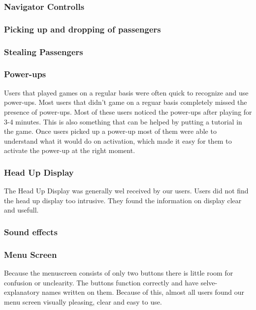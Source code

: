{\subsubsection*{Navigator Controlls}

\subsubsection*{Picking up and dropping of passengers}

\subsubsection*{Stealing Passengers}

\subsubsection*{Power-ups}

Users that played games on a regular basis were often quick to recognize and use power-ups. Most users that didn't game on a reguar basis  completely missed the presence of power-ups. Most of these users noticed the power-ups after playing for 3-4 minutes. This is also something that can be helped by putting a tutorial in the game. Once users picked up a power-up most of them were able to understand what it would do on activation, which made it easy for them to activate the power-up at the right moment.


\subsubsection*{Head Up Display}

The Head Up Display was generally wel received by our users. Users did not find the head up display too intrusive. They found the  information on display clear and usefull.

\subsubsection*{Sound effects}

\subsubsection*{Menu Screen}
Because the menuscreen consists of only two buttons there is little room for confusion or unclearity. The buttons function correctly and have selve-explanatory names written on them. Because of this, almost all users found our menu screen visually pleasing, clear and easy to use.

}
